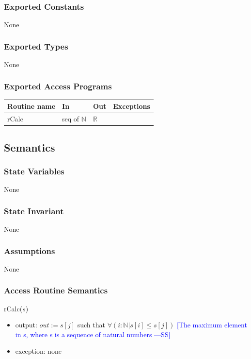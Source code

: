 \documentclass[12pt,fleqn]{examtst}
\newcommand{\authornote}[3]{\textcolor{#1}{[#3 ---#2]}}
\newcommand{\authornote}[3]{}
\newcommand{\wss}[1]{\authornote{blue}{SS}{#1}}
\begin{document}
\subsubsection* {Exported Constants}

None

\subsubsection* {Exported Types}

None 

\subsubsection* {Exported Access Programs}

\begin{tabular}{| l | l | l | p{5cm} |}
\hline
\textbf{Routine name} & \textbf{In} & \textbf{Out} & \textbf{Exceptions}\\
\hline
rCalc & seq of $\mathbb{N}$ & $\mathbb{R}$ & ~\\
\hline
\end{tabular}

\subsection* {Semantics}

\subsubsection* {State Variables}

None

\subsubsection* {State Invariant}

None

\subsubsection* {Assumptions}

None

\subsubsection* {Access Routine Semantics}

rCalc($s$)
\begin{itemize}
\item output: $out :=  s[j]$ such that $\forall(i: \mathbb{N} | s[i] \le s[j])$ \wss{The maximum element in s, where s is a sequence of natural
    numbers}
\item exception: none
\end{itemize}
\end{document}
